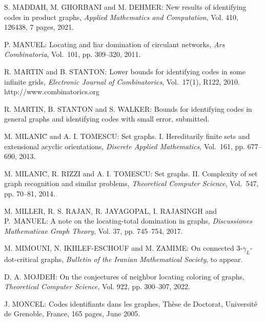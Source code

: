 \begin{thebibliography}{999}
S. MADDAH, M. GHORBANI and M. DEHMER: New results of identifying codes in product graphs, {\it Applied Mathematics and Computation}, Vol. 410, 126438, 7 pages, 2021.

P. MANUEL: Locating and liar domination of circulant networks, {\it Ars Combinatoria}, Vol.~101, pp. 309--320, 2011.

%
%
R. MARTIN and B. STANTON: Lower bounds for identifying codes in some infinite grids, {\it Electronic Journal of Combinatorics}, Vol.~17(1), R122, 2010.\\
http://www.combinatorics.org

R. MARTIN, B. STANTON and S. WALKER: Bounds for identifying codes in general graphs and  identifying codes with small error, submitted.

M. MILANI\u{C} and A. I. TOMESCU: Set graphs. I. Hereditarily finite sets and extensional acyclic orientations, {\it Discrete Applied Mathematics}, Vol.~161, pp. 677--690, 2013.

M. MILANI\u{C}, R. RIZZI and A. I. TOMESCU: Set graphs. II. Complexity of set graph recognition and similar problems, {\it Theoretical Computer Science}, Vol.~547, pp. 70--81, 2014.

M. MILLER, R. S. RAJAN, R. JAYAGOPAL, I. RAJASINGH and P.~MA\-NUEL: A note on the locating-total domination in graphs, {\it Discussiones Mathematicae Graph Theory}, Vol. 37, pp. 745--754, 2017.

M. MIMOUNI, N. IKHLEF-ESCHOUF and M. ZAMIME: On connected 3-$\gamma_L$-dot-critical graphs, {\it Bulletin of the Iranian Mathematical Society}, to appear.

D. A. MOJDEH: On the conjectures of neighbor locating coloring of graphs, {\it Theoretical Computer Science}, Vol. 922, pp. 300--307, 2022.

J. MONCEL: Codes identifiants dans les graphes, Th\`ese de
Doctorat, Universit\'e de Grenoble, France, 165 pages, June 2005.


\end{thebibliography}
